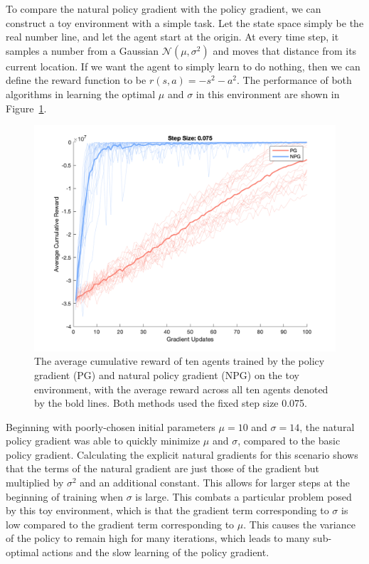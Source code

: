 \documentclass[twoside,10pt]{article}
\begin{document}
To compare the natural policy gradient with the policy gradient, we can construct a toy environment with a simple task. Let the state space simply be the real number line, and let the agent start at the origin. At every time step, it samples a number from a Gaussian $\mathcal{N}(\mu, \sigma^2)$ and moves that distance from its current location. If we want the agent to simply learn to do nothing, then we can define the reward function to be $r(s,a) = -s^2 - a^2$. The performance of both algorithms in learning the optimal $\mu$ and $\sigma$ in this environment are shown in Figure~\ref{fig:PG}.

\begin{figure}[H]
    \centering
    \includegraphics[scale=0.4]{img/PG-reward.png}
    \caption{The average cumulative reward of ten agents trained by the policy gradient (PG) and natural policy gradient (NPG) on the toy environment, with the average reward across all ten agents denoted by the bold lines. Both methods used the fixed step size 0.075.}
    \label{fig:PG}
\end{figure}

Beginning with poorly-chosen initial parameters $\mu = 10$ and $\sigma = 14$, the natural policy gradient was able to quickly minimize $\mu$ and $\sigma$, compared to the basic policy gradient. Calculating the explicit natural gradients for this scenario shows that the terms of the natural gradient are just those of the gradient but multiplied by $\sigma^2$ and an additional constant. This allows for larger steps at the beginning of training when $\sigma$ is large. This combats a particular problem posed by this toy environment, which is that the gradient term corresponding to $\sigma$ is low compared to the gradient term corresponding to $\mu$. This causes the variance of the policy to remain high for many iterations, which leads to many sub-optimal actions and the slow learning of the policy gradient.\cite{peters-schaal}
\end{document}
